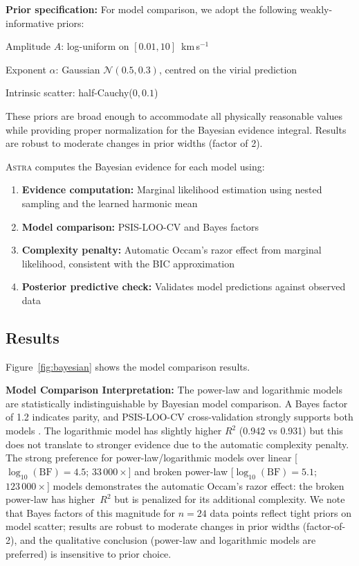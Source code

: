 \documentclass[usenatbib]{rasti}
\newcommand{\astra}{\textsc{Astra}\xspace}
\begin{document}
\textbf{Prior specification:}
For model comparison, we adopt the following weakly-informative priors:
\begin{description}
  \item Amplitude $A$: log-uniform on $[0.01, 10]$~km\,s$^{-1}$
  \item Exponent $\alpha$: Gaussian $\mathcal{N}(0.5, 0.3)$, centred on the virial prediction
  \item Intrinsic scatter: half-Cauchy($0, 0.1$)
\end{description}
These priors are broad enough to accommodate all physically reasonable values while providing proper normalization for the Bayesian evidence integral.
Results are robust to moderate changes in prior widths (factor of 2).

\astra computes the Bayesian evidence for each model using:
\begin{enumerate}
  \item[(i)] \textbf{Evidence computation:} Marginal likelihood estimation using nested sampling and the learned harmonic mean \citep{SpurioMancini+2023}
  \item[(ii)] \textbf{Model comparison:} PSIS-LOO-CV and Bayes factors \citep{Eadie+2023}
  \item[(iii)] \textbf{Complexity penalty:} Automatic Occam's razor effect from marginal likelihood, consistent with the BIC approximation \citep{Schwarz1978}
  \item[(iv)] \textbf{Posterior predictive check:} Validates model predictions against observed data
\end{enumerate}

\subsection{Results}
\label{sec:tc5:results}

Figure~\ref{fig:bayesian} shows the model comparison results.

\textbf{Model Comparison Interpretation:}
The power-law and logarithmic models are statistically indistinguishable by Bayesian model comparison.
A Bayes factor of 1.2 indicates parity, and PSIS-LOO-CV cross-validation strongly supports both models \citep{Eadie+2023}.
The logarithmic model has slightly higher $R^2$ (0.942 vs 0.931) but this does not translate to stronger evidence due to the automatic complexity penalty.
The strong preference for power-law/logarithmic models over linear [$\log_{10}(\mathrm{BF}) = 4.5$; $33\,000\times$] and broken power-law [$\log_{10}(\mathrm{BF}) = 5.1$; $123\,000\times$] models demonstrates the automatic Occam's razor effect: the broken power-law has higher~$R^2$ but is penalized for its additional complexity. We note that Bayes factors of this magnitude for $n = 24$ data points reflect tight priors on model scatter; results are robust to moderate changes in prior widths (factor-of-2), and the qualitative conclusion (power-law and logarithmic models are preferred) is insensitive to prior choice.
\end{document}
